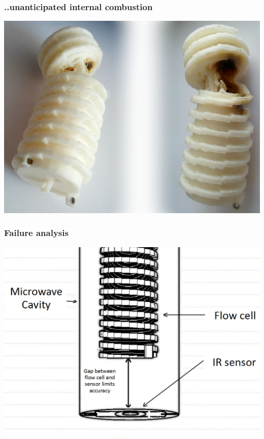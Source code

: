 \documentclass[10pt, compress]{beamer}
\begin{document}
\begin{frame}
\frametitle{..unanticipated internal combustion}
\vspace{-1cm}
\includegraphics[width=\textwidth]{flowfail.PNG}
\end{frame}

\begin{frame}
\frametitle{Failure analysis}\vspace{-1cm}
\includegraphics[width=\textwidth]{fanalysis.PNG}
\end{frame}
\end{document}
